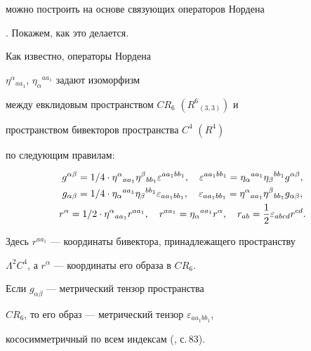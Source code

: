 можно построить на основе связующих операторов Нордена


\cite{Nord1}. Покажем, как это делается.


Как известно, операторы Нордена


$\eta^\alpha{}_{aa_1}$, $\eta_\alpha{}^{aa_1}$ задают изоморфизм


между евклидовым пространством $CR_6$ $(R^6{}_{(3,3)})$ и


пространством бивекторов пространства $C^4$ $(R^4)$


по следующим правилам:


\begin{gather}


g^{\alpha\beta}=1/4\cdot \eta^{\alpha}{}_{aa_1} \eta^{\beta}{}_{bb_1}


\varepsilon^{aa_1bb_1},\quad


\varepsilon^{aa_1bb_1}=


\eta_{\alpha}{}^{aa_1} \eta_{\beta}{}^{bb_1}g^{\alpha\beta},\notag\\


%


\label{e2}


g_{\alpha\beta}=1/4\cdot \eta_{\alpha}{}^{aa_1} \eta_{\beta}{}^{bb_1}


\varepsilon_{aa_1bb_1},\quad


\varepsilon_{aa_1bb_1}=


\eta^{\alpha}{}_{aa_1} \eta^{\beta}{}_{bb_1}g_{\alpha\beta},\\


%


r^{\alpha}=1/2\cdot \eta^{\alpha}{}_{aa_1}r^{aa_1},\quad


r^{aa_1}=\eta_{\alpha}{}^{aa_1}r^{\alpha},\quad


r_{ab}=\frac{1}{2}\varepsilon_{abcd}r^{cd}.\notag


\end{gather}


Здесь $r^{aa_1}$ --- координаты бивектора, принадлежащего пространству


$\Lambda^2C^4$, а $r^{\alpha}$ --- координаты его образа в $CR_6$.


Если $g_{\alpha\beta}$ --- метрический тензор пространства


$CR_6$, то его образ --- метрический тензор $\varepsilon_{aa_1bb_1}$,


кососимметричный по всем индексам (\cite{Pen1}, с.\,83).





